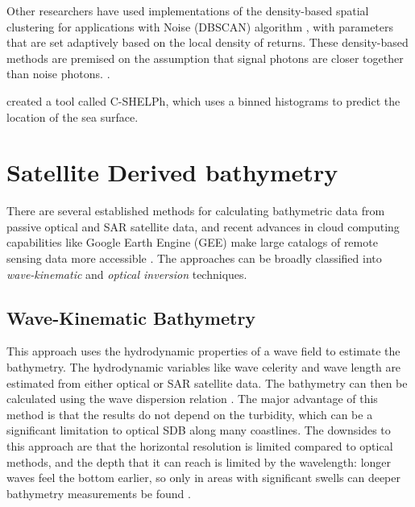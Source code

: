 Other researchers have used implementations of the density-based spatial clustering for applications with Noise (DBSCAN) algorithm \parencite{Ester1996}, with parameters that are set adaptively based on the local density of returns. These density-based methods are premised on the assumption that signal photons are closer together than noise photons. \parencite{Neuenschwander2019}.

\citeauthor{Thomas2022} created a tool called C-SHELPh, which uses a binned histograms to predict the location of the sea surface.

\section{Satellite Derived bathymetry}
There are several established methods for calculating bathymetric data from passive optical and SAR satellite data, and recent advances in cloud computing capabilities like Google Earth Engine (GEE) \parencite{Gorelick2017a} make large catalogs of remote sensing data more accessible \parencite{Pike2019,Turner2021}. The approaches can be broadly classified into \emph{wave-kinematic} and \emph{optical inversion} techniques.

\subsection{Wave-Kinematic Bathymetry}
This approach uses the hydrodynamic properties of a wave field to estimate the bathymetry. The hydrodynamic variables like wave celerity and wave length are estimated from either optical or SAR satellite data. The bathymetry can then be calculated using the wave dispersion relation \cite{Almar2021e}. The major advantage of this method is that the results do not depend on the turbidity, which can be a significant limitation to optical SDB along many coastlines. The downsides to this approach are that the horizontal resolution is limited compared to optical methods, and the depth that it can reach is limited by the wavelength: longer waves feel the bottom earlier, so only in areas with significant swells can deeper bathymetry measurements be found \parencite{Almar2021e}.


